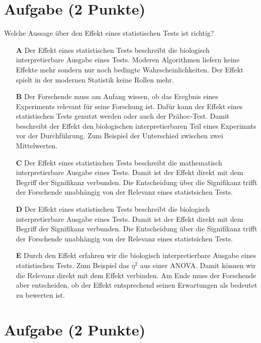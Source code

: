 \documentclass[a4paper, 9pt]{scrartcl}\usepackage[]{graphicx}\usepackage[]{xcolor}
\begin{document}
\section{Aufgabe \hfill (2 Punkte)}



Welche Aussage über den Effekt eines statistischen Tests ist richtig?



\begin{enumerate}
\item [\textbf{A} \msquare] Der Effekt eines statistischen Tests beschreibt die biologisch interpretierbare Ausgabe eines Tests. Moderen Algorithmen liefern keine Effekte mehr sondern nur noch bedingte Wahrscheinlichkeiten. Der Effekt spielt in der modernen Statistik keine Rollen mehr.
\item [\textbf{B} \msquare] Der Forschende muss am Anfang wissen, ob das Eregbnis eines Experiments relevant für seine Forschung ist. Dafür kann der Effekt eines statistischen Tests genutzt werden oder auch der Prähoc-Test. Damit beschreibt der Effekt den biologischen interpretierbaren Teil eines Experimnts vor der Durchführung. Zum Beispiel der Unterschied zwischen zwei Mittelwerten.
\item [\textbf{C} \msquare] Der Effekt eines statistischen Tests beschreibt die mathematisch interpretierbare Ausgabe eines Tests. Damit ist der Effekt direkt mit dem Begriff der Signifikanz verbunden. Die Entscheidung über die Signifikanz trifft der Forschende unabhängig von der Relevanz eines statistsichen Tests.
\item [\textbf{D} \msquare] Der Effekt eines statistischen Tests beschreibt die biologisch interpretierbare Ausgabe eines Tests. Damit ist der Effekt direkt mit dem Begriff der Signifikanz verbunden. Die Entscheidung über die Signifikanz trifft der Forschende unabhängig von der Relevanz eines statistsichen Tests.
\item [\textbf{E} \msquare] Durch den Effekt erfahren wir die biologisch interpretierbare Ausgabe eines statistischen Tests. Zum Beispiel das $\eta^2$ aus einer ANOVA. Damit können wir die Relevanz direkt mit dem Effekt verbinden. Am Ende muss der Forschende aber entscheiden, ob der Effekt entsprechend seinen Erwartungen als bedeutet zu bewerten ist.
\end{enumerate}

\section{Aufgabe \hfill (2 Punkte)}
\end{document}

